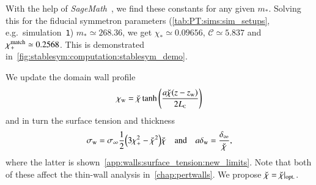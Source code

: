 With the help of \textit{SageMath}~\citep{sagemath}, we find these constants for any given $m_\ast$. 
Solving this for the fiducial symmetron parameters (\cref{tab:PT:sims:sim_setups}, e.g.~simulation~\texttt{1}) %
$m_\ast \simeq 268.36$, we get $\chi_\ast \simeq 0.09656$, $\mathcal{C}\simeq 5.837$ and $\chi_+^\mathrm{match}\simeq 0.2568$. This is demonstrated in~\cref{fig:stablesym:computation:stablesym_demo}. 



We update the domain wall profile
\begin{equation}\label{eq:stablesym:chi_w_quasistatic_FLRW_updated}
    \chi_\mathrm{w} = \breve{\chi} \tanh{{\left(  \frac{a\breve{\chi}(z-z\ensuremath{_\mathrm{w}})}{2L_{\text{\tiny{C}}}}  \right)}}
\end{equation}
and in turn the surface tension and thickness
\begin{equation}
    \sigma_\mathrm{w} = \sigma_\infty \frac{1}{2} {\left(  3\chi_+^2- \breve{\chi}^2  \right)}\breve{\chi} \quad\text{and}\quad a\delta_\mathrm{w} = \frac{\delta_\infty}{\breve{\chi}} ,
\end{equation}
where the latter is shown~\cref{app:walls:surface_tension:new_limits}. %
Note that both of these affect the thin-wall analysis in~\cref{chap:pertwalls}. We propose $\breve{\chi}= \breve{\chi}\rvert_\mathrm{opt.}$.




